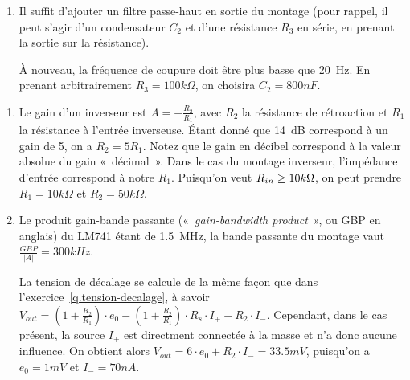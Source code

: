 \documentclass{../../template/tp}
\begin{document}
{\begin{enumerate}
        En prenant arbitrairement $R_1 = 1k\Omega$, on a $R_2 = 100k\Omega$, et donc $C >> 8 \mu F$.
        En pratique, un à deux ordres de grandeur suffisent~: prenons $C = 80 \mu F$.

        \item Il suffit d'ajouter un filtre passe-haut en sortie du montage (pour rappel, il peut s'agir d'un condensateur $C_2$ et d'une résistance $R_3$ en série, en prenant la sortie sur la résistance).

        À nouveau, la fréquence de coupure doit être plus basse que 20~Hz.
        En prenant arbitrairement $R_3 = 100 k\Omega$, on choisira $C_2 = 800 nF$.
    \end{enumerate}
}

{
    \begin{enumerate}
        \item Le gain d'un inverseur est $A = -\frac{R_2}{R_1}$, avec $R_2$ la résistance de rétroaction et $R_1$ la résistance à l'entrée inverseuse.
        Étant donné que 14~dB correspond à un gain de 5, on a $R_2 = 5 R_1$. Notez que le gain en décibel correspond à la valeur absolue du gain «~décimal~».
        Dans le cas du montage inverseur, l'impédance d'entrée correspond à notre $R_1$.
        Puisqu'on veut $R_{in} \geq 10 k\ohm$, on peut prendre $R_1 = 10 k\Omega$ et $R_2 = 50 k\Omega$.

        \item Le produit gain-bande passante («~\textit{gain-bandwidth product}~», ou GBP en anglais) du LM741 étant de 1.5~MHz, la bande passante du montage vaut $\frac{GBP}{|A|} = 300 kHz$.

        La tension de décalage se calcule de la même façon que dans l'exercice~\ref{q.tension-decalage}, à savoir $V_{out} = (1+\frac{R_2}{R_1})\cdot e_0 -(1+\frac{R_2}{R_1}) \cdot R_s \cdot I_+ + R_2 \cdot I_-$.
        Cependant, dans le cas présent, la source $I_+$ est directment connectée à la masse et n'a donc aucune influence.
        On obtient alors $V_{out} = 6\cdot e_0 + R_2 \cdot I_- = 33.5 mV$, puisqu'on a $e_0 = 1mV$ et $I_- = 70nA$.
    \end{enumerate}
}
\end{document}

